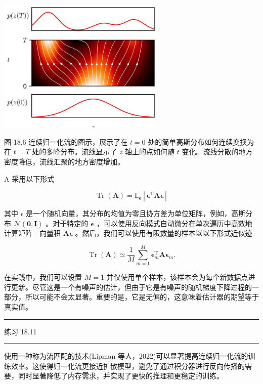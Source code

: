 \documentclass[10pt]{article}
\newcommand{\HRule}{\begin{center}\rule{0.9\linewidth}{0.2mm}\end{center}}
\begin{document}
\begin{center}
\includegraphics[max width=0.6\textwidth]{images/0194e279-9b28-703a-88f4-c3ac21e2010d_577_786_342_770_622_0.jpg}
\end{center}
\hspace*{3em} 

图 18.6 连续归一化流的图示，展示了在 \(t = 0\) 处的简单高斯分布如何连续变换为在 \(t = T\) 处的多峰分布。流线显示了 \(z\) 轴上的点如何随 \(t\) 变化。流线分散的地方密度降低，流线汇聚的地方密度增加。

A 采用以下形式

\[
\operatorname{Tr}\left( \mathbf{A}\right)  = {\mathbb{E}}_{\mathbf{\epsilon }}\left\lbrack  {{\mathbf{\epsilon }}^{\mathrm{T}}\mathbf{A}\mathbf{\epsilon }}\right\rbrack   \tag{18.29}
\]

其中 \(\epsilon\) 是一个随机向量，其分布的均值为零且协方差为单位矩阵，例如，高斯分布 \(\mathcal{N}\left( {\mathbf{0},\mathbf{I}}\right)\) 。对于特定的 \(\mathbf{\epsilon }\) ，可以使用反向模式自动微分在单次遍历中高效地计算矩阵 - 向量积 \(\mathbf{A}\mathbf{\epsilon }\) 。然后，我们可以使用有限数量的样本以以下形式近似迹

\[
\operatorname{Tr}\left( \mathbf{A}\right)  \simeq  \frac{1}{M}\mathop{\sum }\limits_{{m = 1}}^{M}{\mathbf{\epsilon }}_{m}^{\mathrm{T}}\mathbf{A}{\mathbf{\epsilon }}_{m}. \tag{18.30}
\]

在实践中，我们可以设置 \(M = 1\) 并仅使用单个样本，该样本会为每个新数据点进行更新。尽管这是一个有噪声的估计，但由于它是有噪声的随机梯度下降过程的一部分，所以可能不会太显著。重要的是，它是无偏的，这意味着估计器的期望等于真实值。

\HRule

练习 18.11

\HRule

使用一种称为流匹配的技术(Lipman 等人，2022)可以显著提高连续归一化流的训练效率。这使得归一化流更接近扩散模型，避免了通过积分器进行反向传播的需要，同时显著降低了内存需求，并实现了更快的推理和更稳定的训练。
\end{document}
